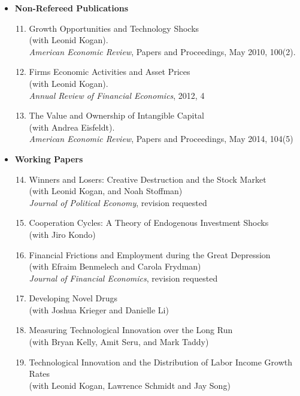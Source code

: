 \documentclass[11pt,letterpaper,serif,overlapped]{res}
\begin{document}
\begin{resume}
\begin{itemize}
\vspace{0.5cm}
\item \textbf{Non-Refereed Publications}
\begin{enumerate}
\setcounter{enumi}{10}
\item Growth Opportunities and Technology Shocks\\ (with Leonid Kogan). \\
\emph{American Economic Review}, Papers and Proceedings, May 2010, 100(2).
\item Firms Economic Activities and Asset Prices\\ (with Leonid Kogan). \\
\emph{Annual Review of Financial Economics}, 2012, 4
\item The Value and Ownership of Intangible Capital\\ (with Andrea Eisfeldt). \\
\emph{American Economic Review}, Papers and Proceedings, May 2014, 104(5)
\end{enumerate}

\vspace{0.5cm}
\item \textbf{Working Papers}
\begin{enumerate}
\setcounter{enumi}{13}
\item Winners and Losers: Creative Destruction and the Stock Market\\ (with Leonid Kogan, and Noah Stoffman)\\\emph{Journal of Political Economy}, revision requested
\item Cooperation Cycles: A Theory of Endogenous Investment Shocks\\ (with Jiro Kondo)
\item Financial Frictions and Employment during the Great Depression\\ (with Efraim Benmelech and Carola Frydman)\\\emph{Journal of Financial Economics}, revision requested
\item Developing Novel Drugs\\(with Joshua Krieger and Danielle Li)
\item Measuring Technological Innovation over the Long Run\\ (with Bryan Kelly, Amit Seru, and Mark Taddy)
\item Technological Innovation and the Distribution of Labor Income Growth Rates\\ (with Leonid Kogan, Lawrence Schmidt and Jay Song)
\end{enumerate}


\end{itemize}
\end{resume}
\end{document}

